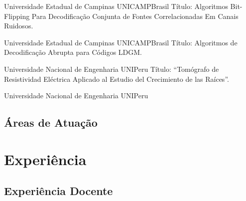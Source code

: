 \documentclass[11pt,a4paper,sans]{moderncv} %
\begin{document}
	      {Universidade Estadual de Campinas}
	      {UNICAMP}{Brasil}
	      {Título: Algoritmos Bit-Flipping Para Decodificação Conjunta de Fontes Correlacionadas Em Canais Ruidosos.}
	      
	      {Universidade Estadual de Campinas}
	      {UNICAMP}{Brasil}
	      {Título: Algoritmos de Decodificação Abrupta para Códigos LDGM.}  %
	      
	      {Universidade Nacional de Engenharia}
	      {UNI}{Peru}
	      {Título: ``Tomógrafo de Resistividad Eléctrica Aplicado al Estudio del Crecimiento de las Raíces''.}
	      
	      {Universidade Nacional de Engenharia}
	      {UNI}{Peru}{}

\subsection{Áreas de Atuação}


%


\section{Experiência}

\subsection{Experiência Docente}
\end{document}
